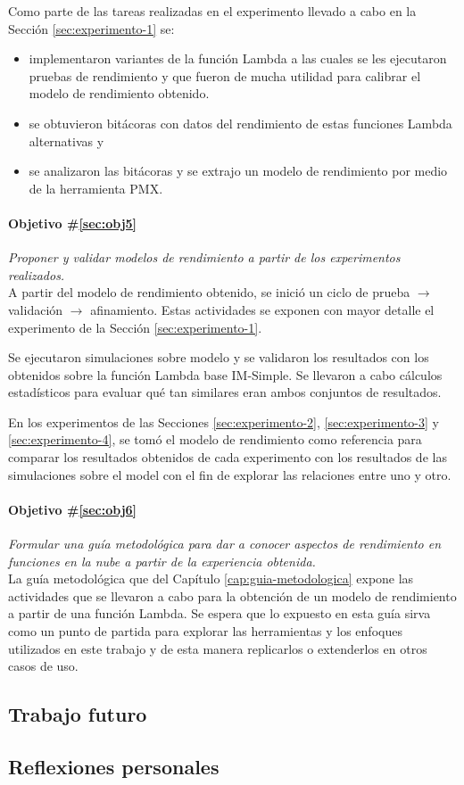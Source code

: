 Como parte de las tareas realizadas en el experimento llevado a cabo en la Sección \ref{sec:experimento-1} se:
\begin{itemize}
    \item implementaron variantes de la función Lambda a las cuales se les ejecutaron pruebas de rendimiento y que fueron de mucha utilidad para calibrar el modelo de rendimiento obtenido.
    \item se obtuvieron bitácoras con datos del rendimiento de estas funciones Lambda alternativas y
    \item se analizaron las bitácoras y se extrajo un modelo de rendimiento por medio de la herramienta PMX.
\end{itemize}


\paragraph{Objetivo \#\ref{sec:obj5}} \emph{Proponer y validar modelos de rendimiento a partir de los experimentos realizados.}\\
A partir del modelo de rendimiento obtenido, se inició un ciclo de prueba $\rightarrow$ validación $\rightarrow$ afinamiento. Estas actividades se exponen con mayor detalle el experimento de la Sección \ref{sec:experimento-1}.

Se ejecutaron simulaciones sobre modelo y se validaron los resultados con los obtenidos sobre la función Lambda base IM-Simple. Se llevaron a cabo cálculos estadísticos para evaluar qué tan similares eran ambos conjuntos de resultados.

En los experimentos de las Secciones \ref{sec:experimento-2}, \ref{sec:experimento-3} y \ref{sec:experimento-4}, se tomó el modelo de rendimiento como referencia para comparar los resultados obtenidos de cada experimento con los resultados de las simulaciones sobre el model con el fin de explorar las relaciones entre uno y otro.

\paragraph{Objetivo \#\ref{sec:obj6}} \emph{Formular una guía metodológica para dar a conocer aspectos de rendimiento en funciones en la nube a partir de la experiencia obtenida.}\\
La guía metodológica que del Capítulo \ref{cap:guia-metodologica} expone las actividades que se llevaron a cabo para la obtención de un modelo de rendimiento a partir de una función Lambda. Se espera que lo expuesto en esta guía sirva como un punto de partida para explorar las herramientas y los enfoques utilizados en este trabajo y de esta manera replicarlos o extenderlos en otros casos de uso.


\subsection{Trabajo futuro}

\subsection{Reflexiones personales}